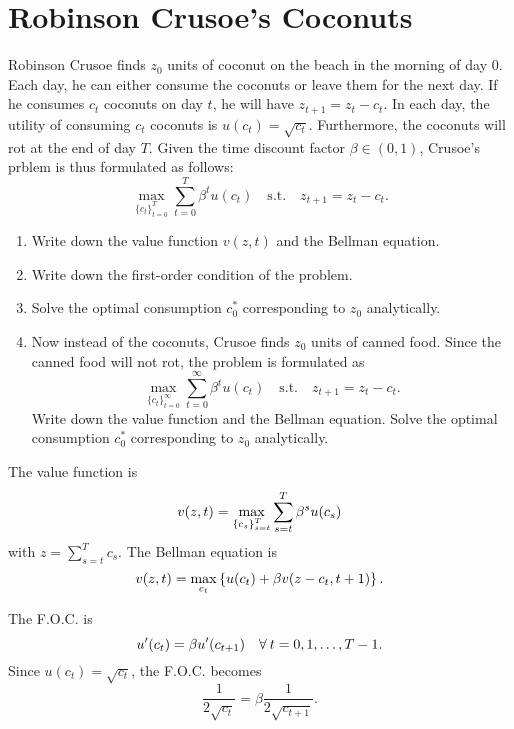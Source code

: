 \documentclass[12pt]{article}
\begin{document}
\section{Robinson Crusoe's Coconuts}
Robinson Crusoe finds $z_0$ units of coconut on the beach in 
the morning of day $0$. Each day, he can either consume the 
coconuts or leave them for the next day. If he consumes $c_t$ 
coconuts on day $t$, he will have $z_{t+1} = z_t - c_t$. In 
each day, the utility of consuming $c_t$ coconuts is $u(c_t) = 
\sqrt{c_t}$. Furthermore, the coconuts will rot at the end of 
day $T$. Given the time discount factor $\beta\in(0,1)$, 
Crusoe's prblem is thus formulated as follows: 
\begin{equation*}
    \max_{\{c_t\}_{t=0}^T} \sum_{t=0}^T \beta^t u(c_t) 
    \quad \text{s.t.} \quad z_{t+1} = z_t - c_t. 
\end{equation*}
\begin{enumerate}
    \item Write down the value function $v(z, t)$ and the 
    Bellman equation. 
    \item Write down the first-order condition of the problem. 
    \item Solve the optimal consumption $c^*_0$ corresponding 
    to $z_0$ analytically. 
    \item Now instead of the coconuts, Crusoe finds $z_0$ units 
    of canned food. Since the canned food will not rot, the 
    problem is formulated as 
    \begin{equation*}
        \max_{\{c_t\}_{t=0}^\infty} \sum_{t=0}^\infty \beta^t u(c_t) 
        \quad \text{s.t.} \quad z_{t+1} = z_t - c_t.
    \end{equation*}
    Write down the value function and the Bellman equation. 
    Solve the optimal consumption $c^*_0$ corresponding to 
    $z_0$ analytically.
\end{enumerate}
\begin{sol}[3.1]
    The value function is 
    \begin{equation*}
        v(z, t) = \max_{\left\{ {c_s} \right\}_{s=t}^T} \sum_{s=t}^T \beta^s u(c_s) 
    \end{equation*}
    with $z = \sum_{s=t}^{T}c_s$. The Bellman equation is 
    \begin{equation*}
        v(z, t) = \max_{c_{t}} \left\{ {u(c_t) + \beta v(z-c_t, t+1)} \right\}.
    \end{equation*}
    \solend
\end{sol}
\begin{sol}[3.2]
    The F.O.C. is 
    \begin{equation*}
        u'(c_t) = \beta u'(c_{t+1})\quad \forall\: t = 0,1,\ldots,T-1.
    \end{equation*}
    Since $u(c_t) = \sqrt{c_t}$, the F.O.C. becomes 
    \begin{equation*}
        \frac{1}{2\sqrt{c_t}} = \beta \frac{1}{2\sqrt{c_{t+1}}}.
    \end{equation*}
    \solend
\end{sol}
\end{document}
